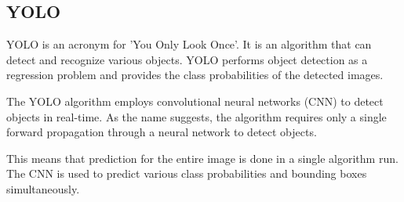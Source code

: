 \subsection{YOLO}
YOLO is an acronym for 'You Only Look Once'. It is an algorithm that can detect
and recognize various objects. YOLO performs object detection as a regression
problem and provides the class probabilities of the detected images.

The YOLO algorithm employs convolutional neural networks (CNN) to detect
objects in real-time. As the name suggests, the algorithm requires only a
single forward propagation through a neural network to detect objects.

This means that prediction for the entire image is done in a single algorithm
run. The CNN is used to predict various class probabilities and bounding boxes
simultaneously. \cite{ylalgo:yolo-algorithm}

